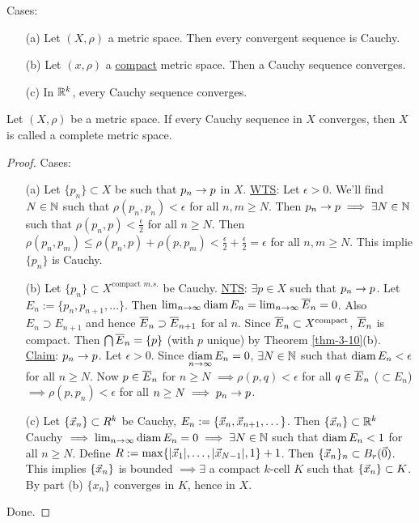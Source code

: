 \documentclass[]{article}
\begin{document}
\begin{theorem}
	Cases:
	\begin{enumerate}
		\item[(a)] Let $(X,\rho)$ a metric space. Then every convergent sequence is Cauchy.
		\item[(b)] Let $(x,\rho)$ a \ul{compact} metric space. Then a Cauchy sequence converges.
		\item[(c)] In $\mathbb{R}^k$, every Cauchy sequence converges.
	\end{enumerate}
\end{theorem}
\begin{definition}
	Let $(X,\rho)$ be a metric space. If every Cauchy sequence in $X$ converges, then $X$ is called a complete metric space.
\end{definition}
\begin{proof}
	Cases:
	\begin{enumerate}
		\item[(a)] Let $\{p_n\}\subset X$ be such that \ul{$p_n\rightarrow p$} in $X$.
			\ul{WTS}: Let $\epsilon > 0$. We'll find $N\in\mathbb{N}$ such that $\rho(p_n,p_n) < \epsilon$ for all $n,m\geq N$.
			Then $p_n\rightarrow p \implies \exists N\in\mathbb{N}$ such that $\rho(p_n,p) < \frac{\epsilon}{2}$ for all $n\geq N$.
			Then $\rho(p_n,p_m) \leq \rho(p_n,p) + \rho(p,p_m) < \frac{\epsilon}{2} + \frac{\epsilon}{2} = \epsilon$ for all $n,m\geq N$.
			This implie $\{p_n\}$ is Cauchy.
		\item[(b)] Let $\{p_n\}\subset X^{\text{compact }m.s.}$ be Cauchy.
			\ul{NTS}: $\exists p\in X$ such that $p_n\rightarrow p$.
			Let $E_n:=\{p_n,p_{n+1},\dots\}$.
			Then $\lim_{n\rightarrow\infty} \text{diam}\,E_n = \lim_{n\rightarrow\infty}\overline{E}_n = 0$.
			Also $E_n\supset E_{n+1}$ and hence $\overline{E}_n\supset \overline{E}_{n+1}$ for al $n$.
			Since $\overline{E}_n\subset X^{\text{compact}}$, $\overline{E}_n$ is compact.
			Then $\bigcap \overline{E}_n = \{p\}$ (with $p$ unique) by Theorem \ref{thm-3-10}(b).
			\ul{Claim}: $p_n\rightarrow p$.
			Let $\epsilon > 0$. Since $\underset{n\rightarrow\infty}{\text{diam}}\,E_n = 0$, $\exists N\in\mathbb{N}$ such that $\text{diam}\,E_n < \epsilon$ for all $n\geq N$.
			Now $p\in\overline{E}_n$ for \ul{$n\geq N$} $\implies \rho(p,q) < \epsilon$ for all $q\in\overline{E}_n$ ($\subset E_n$) $\implies \rho(p,p_n)<\epsilon$ for all $n\geq N \implies p_n\rightarrow p$.
		\item[(c)] Let $\{\vec{x}_n\}\subset R^k$ be Cauchy, $E_n:=\{\vec{x}_n,\vec{x}_{n+1},\dots\}$.
			Then $\{\vec{x}_n\}\subset \mathbb{R}^k$ Cauchy $\implies \lim_{n\rightarrow\infty}\text{diam}\,E_n = 0 \implies \exists N\in\mathbb{N}$ such that $\text{diam}\,E_n < 1$ for all $n\geq N$.
			Define $R := \max\{|\vec{x}_1|,\dots,|\vec{x}_{N-1}|,1\}+1$.
			Then $\{\vec{x}_n\}_n\subset B_r(\vec{0})$. This implies $\{\vec{x}_n\}$ is bounded $\implies \exists$ a compact $k$-cell $K$ such that $\{\vec{x}_n\}\subset K$.
			By part (b) $\{x_n\}$ converges in $K$, hence in $X$.
	\end{enumerate}
	Done.
\end{proof}
\end{document}

